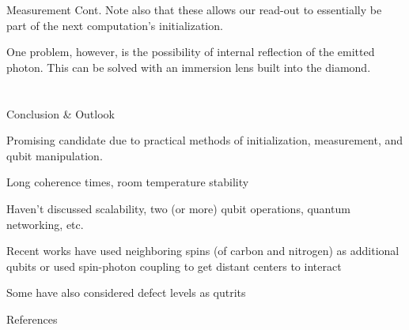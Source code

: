 \documentclass[11pt]{beamer}
\begin{document}
\begin{frame}{Measurement Cont.}
Note also that these allows our read-out to essentially be part of the next computation's initialization.

\vspace{.5cm}

One problem, however, is the possibility of internal reflection of the emitted photon. This can be solved with an immersion lens built into the diamond.
\end{frame}

\section*{ }
\begin{frame}{Conclusion \& Outlook}

Promising candidate due to practical methods of initialization, measurement, and qubit manipulation. 

\medskip

Long coherence times, room temperature stability

\medskip

Haven't discussed scalability, two (or more) qubit operations, quantum networking, etc.

\medskip

Recent works have used neighboring spins (of carbon and nitrogen) as additional qubits or used spin-photon coupling to get distant centers to interact

\medskip

Some have also considered defect levels as qutrits

\end{frame}

\begin{frame}[allowframebreaks]{References}


 

\end{frame}
\end{document}
